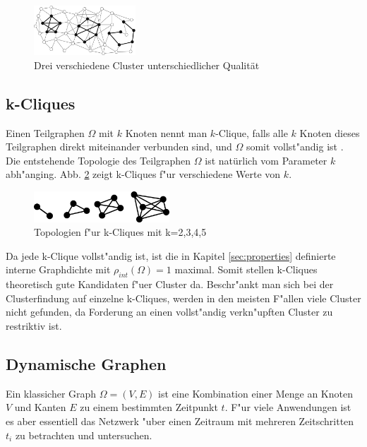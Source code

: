 \documentclass[journal]{vgtc}
\begin{document}
  \begin{figure}[h]
    \centering
    \includegraphics[width=1.5in]{images/good_cluster}
    \caption{\label{fig:comp_cluster} Drei verschiedene Cluster unterschiedlicher Qualität \cite{Schaeffer}}
  \end{figure}
  
  \subsection{k-Cliques}
  \label{sec:k_cliques}
  	Einen Teilgraphen $\Omega$ mit $k$ Knoten nennt man $k$-Clique, falls alle $k$ Knoten dieses 
  	Teilgraphen direkt miteinander verbunden sind, und $\Omega$ somit vollst"andig ist \cite{CPM}. 
  	Die entstehende Topologie des Teilgraphen $\Omega$ ist natürlich vom Parameter $k$ abh"anging.
  	Abb. \ref{fig:k_cliques} zeigt k-Cliques f"ur verschiedene Werte von $k$.
  	
  	\begin{figure}[h]
  	 \centering
  	 \includegraphics[width=2in]{images/k-cliques-example}
  	 \caption{\label{fig:k_cliques} Topologien f"ur k-Cliques mit k=2,3,4,5}
  	\end{figure}

  	
  	Da jede k-Clique vollst"andig ist, ist die in Kapitel \ref{sec:properties} definierte
  	interne Graphdichte mit $\rho_{int}(\Omega)=1$ maximal. Somit stellen k-Cliques theoretisch gute 
  	Kandidaten f"uer Cluster da. Beschr"ankt man sich bei der Clusterfindung auf einzelne k-Cliques,
  	werden in den meisten F"allen viele Cluster nicht gefunden, da Forderung an einen vollst"andig
  	verkn"upften Cluster zu restriktiv ist.
    
  \subsection{Dynamische Graphen}
	Ein klassicher Graph $\Omega=(V,E)$ ist eine Kombination einer Menge an Knoten $V$ und
	Kanten $E$ zu einem bestimmten Zeitpunkt $t$. F"ur viele Anwendungen
	ist es aber essentiell das Netzwerk "uber einen Zeitraum mit mehreren Zeitschritten $t_i$ zu
	betrachten und untersuchen.
	
\end{document}
